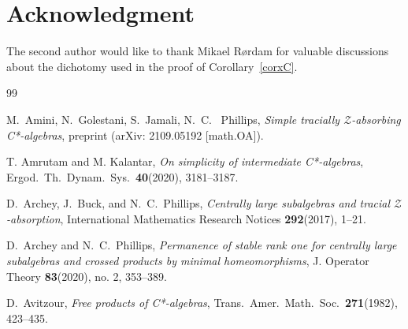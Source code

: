 \documentclass[11pt]{amsart}
\theoremstyle{plain}
\theoremstyle{definition}
\theoremstyle{remark}
\numberwithin{equation}{section}
\begin{document}
\section*{Acknowledgment}
The second author would like to thank Mikael R{\o}rdam
for valuable discussions about the dichotomy used in
the proof of Corollary~\ref{corxC}.




\begin{thebibliography}{99}

M.~Amini, N.~Golestani, S.~Jamali, N.~C. \ Phillips,
{\emph{Simple tracially $\mathcal{Z}$-absorbing C*-algebras}}, 
preprint (arXiv: 2109.05192  [math.OA]).


T. Amrutam and M. Kalantar, 
\emph{On simplicity of intermediate C*-algebras}, 
Ergod.\  Th.\  Dynam.\  Sys.\  {\textbf{40}}(2020), 3181--3187.

D.~Archey, J.~Buck, and N.~C.\  Phillips,
{\emph{Centrally large subalgebras and tracial
${\mathcal{Z}}$-absorption}},
International Mathematics Research Notices
{\textbf{292}}(2017), 1--21.

D.~Archey and N.~C.\  Phillips,
{\emph{Permanence
of stable rank one for centrally large subalgebras and
crossed products by minimal homeomorphisms}},
 J. Operator Theory \textbf{83}(2020), no. 2, 353--389.

D.~Avitzour, {\emph{Free products of C*-algebras}},
Trans.\  Amer.\  Math.\  Soc.\  {\textbf{271}}(1982), 423--435.




\end{thebibliography}
\end{document}
